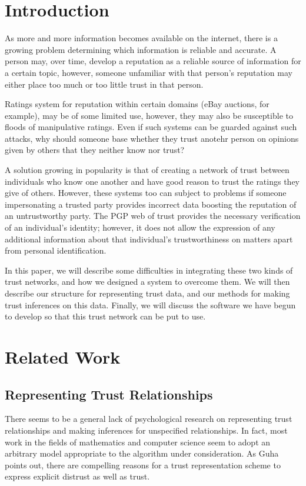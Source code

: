 \documentclass{acm_proc_article-sp}
\begin{document}
\section{Introduction}
As more and more information becomes available on the internet, there is a growing problem determining which information is reliable and accurate.  A person may, over time, develop a reputation as a reliable source of information for a certain topic, however, someone unfamiliar with that person's reputation may either place too much or too little trust in that person.  

Ratings system for reputation within certain domains (eBay auctions, for example), may be of some limited use, however, they may also be susceptible to floods of manipulative ratings.  Even if such systems can be guarded against such attacks, why should someone base whether they trust anotehr person on opinions given by others that they neither know nor trust?

A solution growing in popularity is that of creating a network of trust between individuals who know one another and have good reason to trust the ratings they give of others.  However, these systems too can subject to problems if someone impersonating a trusted party provides incorrect data boosting the reputation of an untrustworthy party.  The PGP web of trust provides the necessary verification of an individual's identity; however, it does not allow the expression of any additional information about that individual's trustworthiness on matters apart from personal identification.

In this paper, we will describe some difficulties in integrating these two kinds of trust networks, and how we designed a system to overcome them.  We will then describe our structure for representing trust data, and our methods for making trust inferences on this data.  Finally, we will discuss the software we have begun to develop so that this trust network can be put to use.

\section{Related Work}

\subsection{Representing Trust Relationships}
There seems to be a general lack of psychological research on representing trust relationships and making inferences for unspecified relationships. In fact, most work in the fields of mathematics and computer science seem to adopt an arbitrary model appropriate to the algorithm under consideration. As Guha points out\cite{guha04propagation}, there are compelling reasons for a trust representation scheme to express explicit distrust as well as trust.
\end{document}
